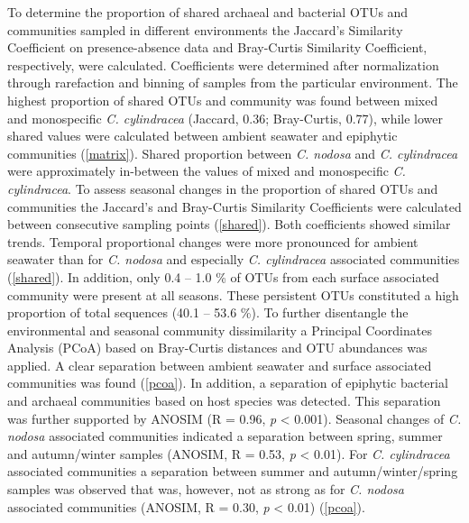 \documentclass[12pt,]{article}
\begin{document}
To determine the proportion of shared archaeal and bacterial OTUs and
communities sampled in different environments the Jaccard's Similarity
Coefficient on presence-absence data and Bray-Curtis Similarity
Coefficient, respectively, were calculated. Coefficients were determined
after normalization through rarefaction and binning of samples from the
particular environment. The highest proportion of shared OTUs and
community was found between mixed and monospecific \emph{C. cylindracea}
(Jaccard, 0.36; Bray-Curtis, 0.77), while lower shared values were
calculated between ambient seawater and epiphytic communities
(\autoref{matrix}). Shared proportion between \emph{C. nodosa} and
\emph{C. cylindracea} were approximately in-between the values of mixed
and monospecific \emph{C. cylindracea}. To assess seasonal changes in
the proportion of shared OTUs and communities the Jaccard's and
Bray-Curtis Similarity Coefficients were calculated between consecutive
sampling points (\autoref{shared}). Both coefficients showed similar
trends. Temporal proportional changes were more pronounced for ambient
seawater than for \emph{C. nodosa} and especially \emph{C. cylindracea}
associated communities (\autoref{shared}). In addition, only 0.4 -- 1.0
\si{\percent} of OTUs from each surface associated community were
present at all seasons. These persistent OTUs constituted a high
proportion of total sequences (40.1 -- 53.6 \si{\percent}). To further
disentangle the environmental and seasonal community dissimilarity a
Principal Coordinates Analysis (PCoA) based on Bray-Curtis distances and
OTU abundances was applied. A clear separation between ambient seawater
and surface associated communities was found (\autoref{pcoa}). In
addition, a separation of epiphytic bacterial and archaeal communities
based on host species was detected. This separation was further
supported by ANOSIM (R = 0.96, \emph{p} \textless{} 0.001). Seasonal
changes of \emph{C. nodosa} associated communities indicated a
separation between spring, summer and autumn/winter samples (ANOSIM, R =
0.53, \emph{p} \textless{} 0.01). For \emph{C. cylindracea} associated
communities a separation between summer and autumn/winter/spring samples
was observed that was, however, not as strong as for \emph{C. nodosa}
associated communities (ANOSIM, R = 0.30, \emph{p} \textless{} 0.01)
(\autoref{pcoa}).
\end{document}
